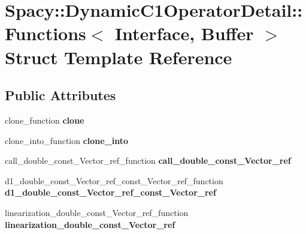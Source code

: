 \hypertarget{structSpacy_1_1DynamicC1OperatorDetail_1_1Functions}{\section{\-Spacy\-:\-:\-Dynamic\-C1\-Operator\-Detail\-:\-:\-Functions$<$ \-Interface, \-Buffer $>$ \-Struct \-Template \-Reference}
\label{structSpacy_1_1DynamicC1OperatorDetail_1_1Functions}
}
\subsection*{\-Public \-Attributes}
\begin{DoxyCompactItemize}
\item 
\hypertarget{structSpacy_1_1DynamicC1OperatorDetail_1_1Functions_af53f1f66130c30afccee6e9b7c2058b5}{clone\-\_\-function {\bfseries clone}}\label{structSpacy_1_1DynamicC1OperatorDetail_1_1Functions_af53f1f66130c30afccee6e9b7c2058b5}

\item 
\hypertarget{structSpacy_1_1DynamicC1OperatorDetail_1_1Functions_acedd24d697060ecebef3c6a99b96c998}{clone\-\_\-into\-\_\-function {\bfseries clone\-\_\-into}}\label{structSpacy_1_1DynamicC1OperatorDetail_1_1Functions_acedd24d697060ecebef3c6a99b96c998}

\item 
\hypertarget{structSpacy_1_1DynamicC1OperatorDetail_1_1Functions_ae4b874c1fcf13f56a24bde140d3d3da4}{call\-\_\-double\-\_\-const\-\_\-\-Vector\-\_\-ref\-\_\-function {\bfseries call\-\_\-double\-\_\-const\-\_\-\-Vector\-\_\-ref}}\label{structSpacy_1_1DynamicC1OperatorDetail_1_1Functions_ae4b874c1fcf13f56a24bde140d3d3da4}

\item 
\hypertarget{structSpacy_1_1DynamicC1OperatorDetail_1_1Functions_a17d1c9b893c457f7ec482907ec4e5925}{d1\-\_\-double\-\_\-const\-\_\-\-Vector\-\_\-ref\-\_\-const\-\_\-\-Vector\-\_\-ref\-\_\-function {\bfseries d1\-\_\-double\-\_\-const\-\_\-\-Vector\-\_\-ref\-\_\-const\-\_\-\-Vector\-\_\-ref}}\label{structSpacy_1_1DynamicC1OperatorDetail_1_1Functions_a17d1c9b893c457f7ec482907ec4e5925}

\item 
\hypertarget{structSpacy_1_1DynamicC1OperatorDetail_1_1Functions_ad8f5e83509d924ef4fc58d36da03bd3b}{linearization\-\_\-double\-\_\-const\-\_\-\-Vector\-\_\-ref\-\_\-function {\bfseries linearization\-\_\-double\-\_\-const\-\_\-\-Vector\-\_\-ref}}\label{structSpacy_1_1DynamicC1OperatorDetail_1_1Functions_ad8f5e83509d924ef4fc58d36da03bd3b}


\end{DoxyCompactItemize}
